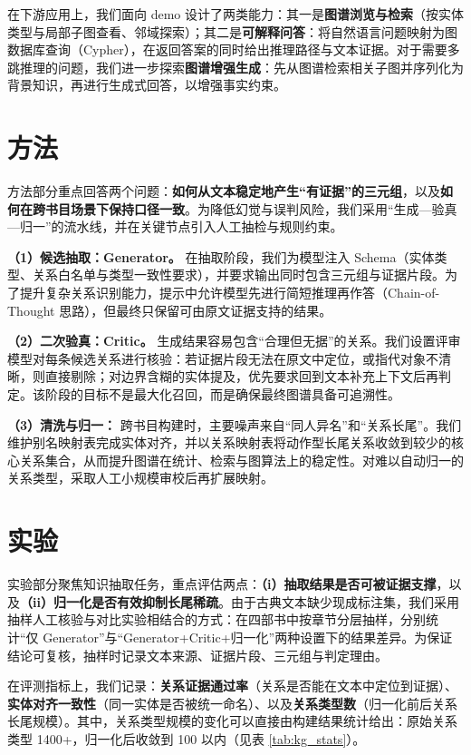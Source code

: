 \documentclass[lang=cn,a4paper,newtx,code=minted]{elegantpaper}
\begin{document}
在下游应用上，我们面向 demo 设计了两类能力：其一是\textbf{图谱浏览与检索}（按实体类型与局部子图查看、邻域探索）；其二是\textbf{可解释问答}：将自然语言问题映射为图数据库查询（Cypher），在返回答案的同时给出推理路径与文本证据。对于需要多跳推理的问题，我们进一步探索\textbf{图谱增强生成}：先从图谱检索相关子图并序列化为背景知识，再进行生成式回答，以增强事实约束。

\section{方法}

方法部分重点回答两个问题：\textbf{如何从文本稳定地产生“有证据”的三元组}，以及\textbf{如何在跨书目场景下保持口径一致}。为降低幻觉与误判风险，我们采用“生成—验真—归一”的流水线，并在关键节点引入人工抽检与规则约束。

\textbf{（1）候选抽取：Generator。} 在抽取阶段，我们为模型注入 Schema（实体类型、关系白名单与类型一致性要求），并要求输出同时包含三元组与证据片段。为了提升复杂关系识别能力，提示中允许模型先进行简短推理再作答（Chain-of-Thought 思路），但最终只保留可由原文证据支持的结果。

\textbf{（2）二次验真：Critic。} 生成结果容易包含“合理但无据”的关系。我们设置评审模型对每条候选关系进行核验：若证据片段无法在原文中定位，或指代对象不清晰，则直接剔除；对边界含糊的实体提及，优先要求回到文本补充上下文后再判定。该阶段的目标不是最大化召回，而是确保最终图谱具备可追溯性。

\textbf{（3）清洗与归一：} 跨书目构建时，主要噪声来自“同人异名”和“关系长尾”。我们维护别名映射表完成实体对齐，并以关系映射表将动作型长尾关系收敛到较少的核心关系集合，从而提升图谱在统计、检索与图算法上的稳定性。对难以自动归一的关系类型，采取人工小规模审校后再扩展映射。

\section{实验}

实验部分聚焦知识抽取任务，重点评估两点：\textbf{（i）抽取结果是否可被证据支撑}，以及\textbf{（ii）归一化是否有效抑制长尾稀疏}。由于古典文本缺少现成标注集，我们采用抽样人工核验与对比实验相结合的方式：在四部书中按章节分层抽样，分别统计“仅 Generator”与“Generator+Critic+归一化”两种设置下的结果差异。为保证结论可复核，抽样时记录文本来源、证据片段、三元组与判定理由。

在评测指标上，我们记录：\textbf{关系证据通过率}（关系是否能在文本中定位到证据）、\textbf{实体对齐一致性}（同一实体是否被统一命名）、以及\textbf{关系类型数}（归一化前后关系长尾规模）。其中，关系类型规模的变化可以直接由构建结果统计给出：原始关系类型 1400+，归一化后收敛到 100 以内（见表 \ref{tab:kg_stats}）。
\end{document}
